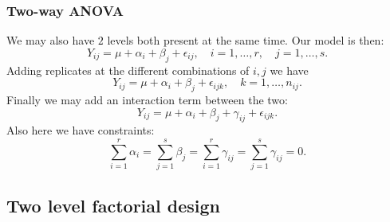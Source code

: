 \subsubsection{Two-way ANOVA}
We may also have $2$ levels both present at the same time. Our model is then:
$$
    Y_{ij} = \mu + \alpha_i + \beta_j + \epsilon_{ij}, \quad i=1,\dots,r, \quad j=1,\dots ,s.
$$
Adding replicates at the different combinations of $i,j$ we have
$$
    Y_{ij} = \mu + \alpha_i + \beta_j + \epsilon_{ijk}, \quad k=1,\dots,n_{ij}.
$$
Finally we may add an interaction term between the two:
$$
    Y_{ij} = \mu + \alpha_i + \beta_j + \gamma_{ij} + \epsilon_{ijk}.
$$
Also here we have constraints:
$$
    \sum_{i=1}^r \alpha_i = \sum_{j=1}^s \beta_j = \sum_{i=1}^r \gamma_{ij} = \sum_{j=1}^s \gamma_{ij} = 0.
$$

\subsection{Two level factorial design}

